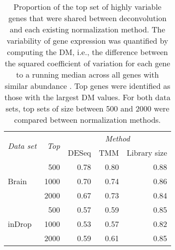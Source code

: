 \documentclass{article}
\begin{document}
\begin{table}[ptb]
    \caption{ 
        Proportion of the top set of highly variable genes that were shared between deconvolution and each existing normalization method.
        The variability of gene expression was quantified by computing the DM, i.e., the difference between the squared coefficient of variation for each gene to a running median across all genes with similar abundance \cite{kolod2015single}. 
        Top genes were identified as those with the largest DM values. 
        For both data sets, top sets of size between 500 and 2000 were compared between normalization methods.
    }
    \begin{center}
        \begin{tabular}{l r r r r}
            \hline
            \multirow{2}{*}{\textit{Data set}} & \multirow{2}{*}{\textit{Top}} & \multicolumn{3}{c}{\textit{Method}} \\
                \cline{3-5}
                & & DESeq & TMM & Library size \\
            \hline
            \multirow{3}{*}{Brain}            
            & 500 & 0.78 & 0.80 & 0.88 \\ 
            & 1000 & 0.70 & 0.74 & 0.86 \\
            & 2000 & 0.67 & 0.73 & 0.84 \\
            \hline
            \multirow{3}{*}{inDrop}            
            & 500  & 0.57 & 0.59 & 0.85 \\ 
            & 1000  & 0.53 & 0.57 & 0.82 \\
            & 2000 & 0.59 & 0.61 & 0.85 \\
            \hline
        \end{tabular}
    \end{center}
\end{table}
\end{document}
